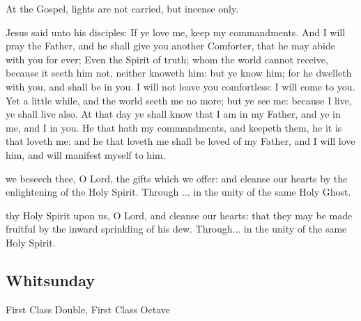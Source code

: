 \begin{rubric}
	At the Gospel, lights are not carried, but incense only.
\end{rubric}

 Jesus said unto his disciples: If ye love me, keep my commandments. And I will pray the Father, and he shall give you another Comforter, that he may abide with you for ever; Even the Spirit of truth; whom the world cannot receive, because it seeth him not, neither knoweth him: but ye know him; for he dwelleth with you, and shall be in you. I will not leave you comfortless: I will come to you. Yet a little while, and the world seeth me no more; but ye see me: because I live, ye shall live also. At that day ye shall know that I am in my Father, and ye in me, and I in you. He that hath my commandments, and keepeth them, he it is that loveth me: and he that loveth me shall be loved of my Father, and I will love him, and will manifest myself to him.


\secret
{} we beseech thee, O Lord, the gifts which we offer: and cleanse our hearts by the enlightening of the Holy Spirit. Through ... in the unity of the same Holy Ghost.


\postcommunion
{} thy Holy Spirit upon us, O Lord, and cleanse our hearts: that they may be made fruitful by the inward sprinkling of his dew. Through... in the unity of the same Holy Spirit.


\clearpage
\subsection{Whitsunday}
\begin{inhead}
    {First Class Double, First Class Octave}
\end{inhead}


